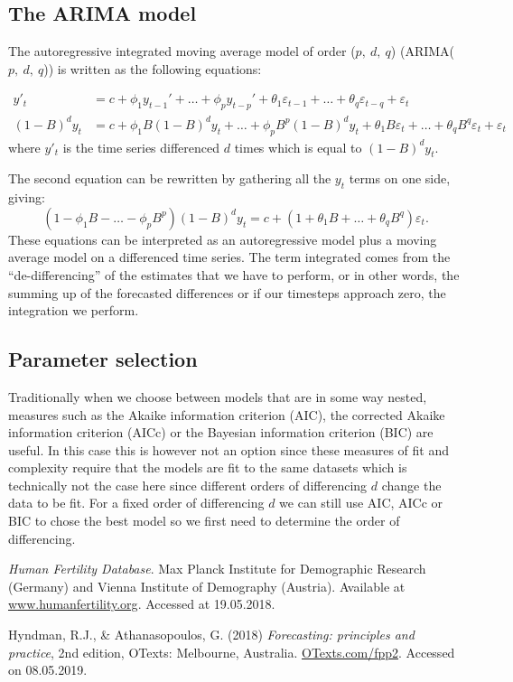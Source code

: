 \documentclass[a4paper, 12pt]{scrartcl}
\begin{document}
\subsection{The ARIMA model}
The autoregressive integrated moving average model of order ($p,~d,~q$) (ARIMA($p,~d,~q$)) is written as the following equations:

\begin{align*}
	y'_t&=c+\phi_1y_{t-1}'+\dots+\phi_py_{t-p}'+\theta_1\varepsilon_{t-1}+\dots+\theta_q\varepsilon_{t-q}+\varepsilon_t\\
	(1-B)^dy_{t}&=c+\phi_1B(1-B)^dy_{t}+\dots+\phi_pB^p(1-B)^dy_t+\theta_1B\varepsilon_t+\dots+\theta_qB^q\varepsilon_{t}+\varepsilon_t
\end{align*}
where $y'_t$ is the time series differenced $d$ times which is equal to $(1-B)^dy_{t}$.

The second equation can be rewritten by gathering all the $y_t$ terms on one side, giving:
\begin{equation*}
	\left(1-\phi_1B-\dots-\phi_pB^p\right)\left(1-B\right)^dy_t=c+\left(1+\theta_1B+\dots+\theta_qB^q\right)\varepsilon_{t}.
\end{equation*}
These equations can be interpreted as an autoregressive model plus a moving average model on a differenced time series.
The term integrated comes from the ``de-differencing'' of the estimates that we have to perform, or in other words, the summing up of the forecasted differences or if our timesteps approach zero, the integration we perform.

\subsection{Parameter selection}

Traditionally when we choose between models that are in some way nested, measures such as the Akaike information criterion (AIC), the corrected Akaike information criterion (AICc) or the Bayesian information criterion (BIC) are useful.
In this case this is however not an option since these measures of fit and complexity require that the models are fit to the same datasets which is technically not the case here since different orders of differencing $d$ change the data to be fit.
For a fixed order of differencing $d$ we can still use AIC, AICc or BIC to chose the best model so we first need to determine the order of differencing.


\begin{thebibliography}{2}
	 \emph{Human Fertility Database}. Max Planck Institute for Demographic Research (Germany) and Vienna Institute of Demography (Austria). Available at \href{www.humanfertility.org}{www.humanfertility.org}. Accessed at 19.05.2018.
	
	 Hyndman, R.J., \& Athanasopoulos, G. (2018) \emph{Forecasting: principles and practice}, 2nd edition, OTexts: Melbourne, Australia. \href{https://otexts.com/fpp2/}{OTexts.com/fpp2}. Accessed on 08.05.2019.
\end{thebibliography}
\end{document}
